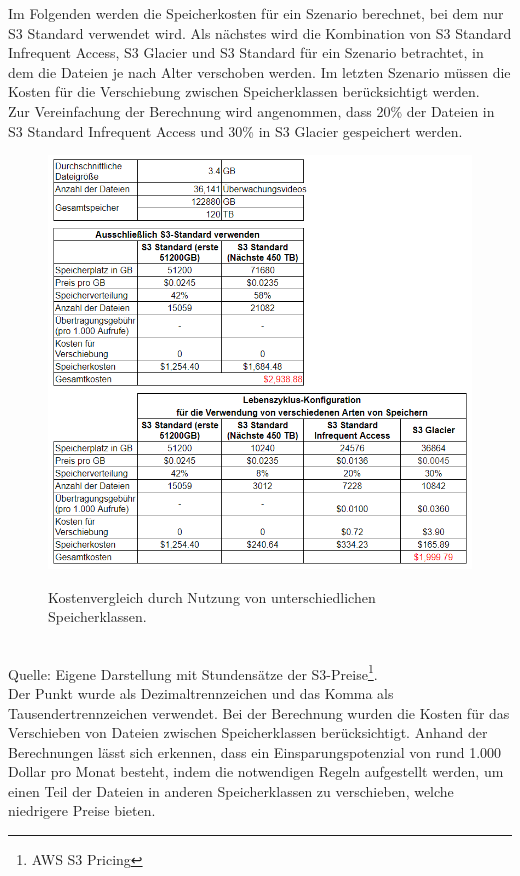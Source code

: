 Im Folgenden werden die Speicherkosten für ein Szenario berechnet, bei dem nur S3 Standard verwendet wird. Als nächstes wird die Kombination von S3 Standard Infrequent Access, S3 Glacier und S3 Standard für ein Szenario betrachtet, in dem die Dateien je nach Alter verschoben werden. Im letzten Szenario müssen die Kosten für die Verschiebung zwischen Speicherklassen berücksichtigt werden.
\\
Zur Vereinfachung der Berechnung wird angenommen, dass 20\% der Dateien in S3 Standard Infrequent Access und 30\% in S3 Glacier gespeichert werden.
\\
\begin{figure}[h!]
  \centering
  \includegraphics[scale=0.75]{sources/Kostenvergleich_Nutzung_unt_Speicherklassen}
  \caption[Kostenvergleich durch Nutzung von unterschiedlichen Speicherklassen]{}\label{fig:Kostenvergleich_Nutzung_unt_Speicherklassen} 
  Kostenvergleich durch Nutzung von unterschiedlichen Speicherklassen.  
\end{figure}\\
Quelle: Eigene Darstellung mit Stundensätze der S3-Preise\footnote{AWS S3 Pricing\cite{AMZ09}}.\\
Der Punkt wurde als Dezimaltrennzeichen und das Komma als Tausendertrennzeichen verwendet.
Bei der Berechnung wurden die Kosten für das Verschieben von Dateien zwischen Speicherklassen berücksichtigt. 
Anhand der Berechnungen lässt sich erkennen, dass ein Einsparungspotenzial von rund 1.000 Dollar pro Monat besteht, indem die notwendigen Regeln aufgestellt werden, um einen Teil der Dateien in anderen Speicherklassen zu verschieben, welche niedrigere Preise bieten.

